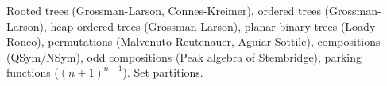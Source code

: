 \documentclass[11pt]{amsart}
\theoremstyle{definition}
\numberwithin{equation}{section}
\begin{document}
Rooted trees (Grossman-Larson, Connes-Kreimer),
ordered trees (Grossman-Larson),
heap-ordered trees (Grossman-Larson),
planar binary trees (Loady-Ronco), permutations (Malvenuto-Reutenauer, Aguiar-Sottile),
compositions (QSym/NSym), odd compositions (Peak algebra of Stembridge),
parking functions ($(n+1)^{n-1}$).
Set partitions.
\end{document}
